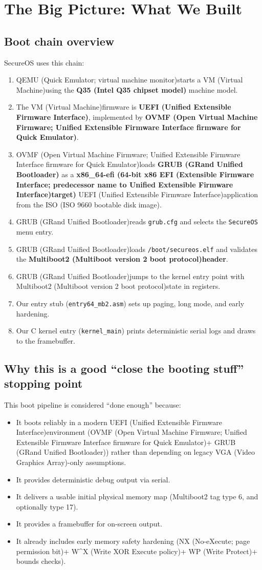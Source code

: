 \documentclass[11pt]{article}
\newcommand{\EFI}{EFI (Extensible Firmware Interface; predecessor name to Unified Extensible Firmware Interface)}
\newcommand{\GRUB}{GRUB (GRand Unified Bootloader)}
\newcommand{\ISOImg}{ISO (ISO 9660 bootable disk image)}
\newcommand{\MBtwo}{Multiboot2 (Multiboot version 2 boot protocol)}
\newcommand{\NX}{NX (No-eXecute; page permission bit)}
\newcommand{\OVMF}{OVMF (Open Virtual Machine Firmware; Unified Extensible Firmware Interface firmware for Quick Emulator)}
\newcommand{\QEMU}{QEMU (Quick Emulator; virtual machine monitor)}
\newcommand{\QThirtyFive}{Q35 (Intel Q35 chipset model)}
\newcommand{\UEFI}{UEFI (Unified Extensible Firmware Interface)}
\newcommand{\VGA}{VGA (Video Graphics Array)}
\newcommand{\VM}{VM (Virtual Machine)}
\newcommand{\WP}{WP (Write Protect)}
\newcommand{\WX}{W\textasciicircum X (Write XOR Execute policy)}
\begin{document}
\newpage
\section{The Big Picture: What We Built}

\subsection{Boot chain overview}
SecureOS uses this chain:
\begin{enumerate}
  \item \QEMU starts a \VM using the \textbf{\QThirtyFive} machine model.
  \item The \VM firmware is \textbf{\UEFI}, implemented by \textbf{\OVMF}.
  \item \OVMF loads \textbf{\GRUB} as a \textbf{x86\_64-efi (64-bit x86 \EFI target)} \UEFI application from the \ISOImg.
  \item \GRUB reads \texttt{grub.cfg} and selects the \texttt{SecureOS} menu entry.
  \item \GRUB loads \texttt{/boot/secureos.elf} and validates the \textbf{\MBtwo header}.
  \item \GRUB jumps to the kernel entry point with \MBtwo state in registers.
  \item Our entry stub (\texttt{entry64\_mb2.asm}) sets up paging, long mode, and early hardening.
  \item Our C kernel entry (\texttt{kernel\_main}) prints deterministic serial logs and draws to the framebuffer.
\end{enumerate}

\subsection{Why this is a good ``close the booting stuff'' stopping point}
This boot pipeline is considered ``done enough'' because:
\begin{itemize}
  \item It boots reliably in a modern \UEFI environment (\OVMF + \GRUB) rather than depending on legacy \VGA-only assumptions.
  \item It provides deterministic debug output via serial.
  \item It delivers a usable initial physical memory map (Multiboot2 tag type 6, and optionally type 17).
  \item It provides a framebuffer for on-screen output.
  \item It already includes early memory safety hardening (\NX + \WX + \WP + bounds checks).
\end{itemize}
\end{document}
